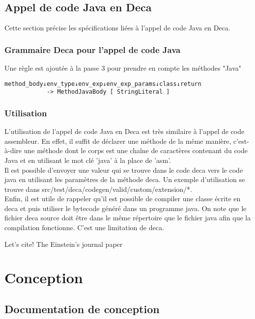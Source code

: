 \documentclass[12pt, a4paper, one side]{article}
\begin{document}
    \subsection{Appel de code Java en Deca}
    Cette section précise les spécifications liées à l'appel de code Java en Deca.
    \subsubsection{Grammaire Deca pour l'appel de code Java}
    Une règle est ajoutée à la passe 3 pour prendre en compte les méthodes "Java"
    \begin{lstlisting}
method_body↓env_type↓env_exp↓env_exp_params↓class↓return
            -> MethodJavaBody [ StringLiteral ]
    \end{lstlisting}

    \subsubsection{Utilisation}
    L'utilisation de l'appel de code Java en Deca est très similaire à l'appel de code assembleur. En effet, il suffit de déclarer une méthode de la même manière, c'est-à-dire une méthode dont le corps est une chaîne de caractères contenant du code Java et en utilisant le mot clé 'java' à la place de 'asm'.
    \\

    Il est possible d'envoyer une valeur qui se trouve dans le code deca vers le code java en utilisant les paramètres de la méthode deca. Un exemple d'utilisation se trouve dans src/test/deca/codegen/valid/custom/extension/*.
    \\

    Enfin, il est utile de rappeler qu'il est possible de compiler une classe écrite en deca et puis utiliser le bytecode généré dans un programme java. On note que le fichier deca source doit être dans le même répertoire que le fichier java afin que la compilation fonctionne. C'est une limitation de deca.

    Let's cite! The Einstein's journal paper  \cite{ref_DexFormatvsJavabytecode}


    \section{Conception}
    \subsection{Documentation de conception}
\end{document}
